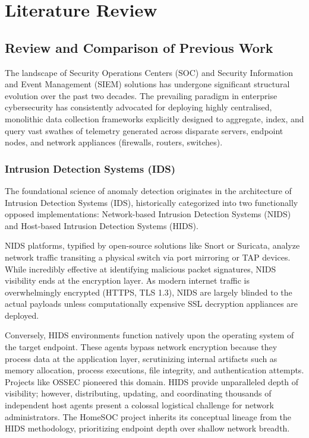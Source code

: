 \chapter{Literature Review}

\section{Review and Comparison of Previous Work}
The landscape of Security Operations Centers (SOC) and Security Information and Event Management (SIEM) solutions has undergone significant structural evolution over the past two decades. The prevailing paradigm in enterprise cybersecurity has consistently advocated for deploying highly centralised, monolithic data collection frameworks explicitly designed to aggregate, index, and query vast swathes of telemetry generated across disparate servers, endpoint nodes, and network appliances (firewalls, routers, switches).

\subsection{Intrusion Detection Systems (IDS)}
The foundational science of anomaly detection originates in the architecture of Intrusion Detection Systems (IDS), historically categorized into two functionally opposed implementations: Network-based Intrusion Detection Systems (NIDS) and Host-based Intrusion Detection Systems (HIDS). 

NIDS platforms, typified by open-source solutions like Snort or Suricata, analyze network traffic transiting a physical switch via port mirroring or TAP devices. While incredibly effective at identifying malicious packet signatures, NIDS visibility ends at the encryption layer. As modern internet traffic is overwhelmingly encrypted (HTTPS, TLS 1.3), NIDS are largely blinded to the actual payloads unless computationally expensive SSL decryption appliances are deployed.

Conversely, HIDS environments function natively upon the operating system of the target endpoint. These agents bypass network encryption because they process data at the application layer, scrutinizing internal artifacts such as memory allocation, process executions, file integrity, and authentication attempts. Projects like OSSEC pioneered this domain. HIDS provide unparalleled depth of visibility; however, distributing, updating, and coordinating thousands of independent host agents present a colossal logistical challenge for network administrators. The HomeSOC project inherits its conceptual lineage from the HIDS methodology, prioritizing endpoint depth over shallow network breadth.

